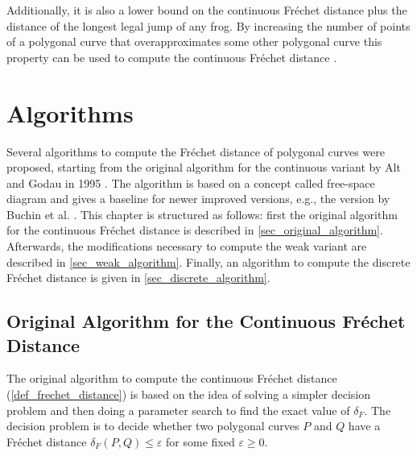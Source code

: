 \documentclass[
oneside,
fontsize=11pt
]{scrartcl}
\begin{document}
Additionally, it is also a lower bound on the continuous Fréchet distance 
plus the distance of the longest legal jump of any frog. 
By increasing the number of points of a polygonal curve that 
overapproximates some other polygonal curve
this property can be used to compute the continuous Fréchet distance \cite{eiter_computing_1994}.






\section{Algorithms}
\label{sec_algorithms}
Several algorithms to compute the Fréchet distance of polygonal curves were proposed, 
starting from the original algorithm for the continuous variant by Alt and Godau in 1995 \cite{alt_computing_1995}.
The algorithm is based on a concept called free-space diagram and gives a baseline for newer improved versions, 
e.g., the version by Buchin et al. \cite{buchin_four_2017}. 
This chapter is structured as follows: 
first the original algorithm for the continuous Fréchet distance is described in \autoref{sec_original_algorithm}.
Afterwards, the modifications necessary to compute the weak variant are described in \autoref{sec_weak_algorithm}.
Finally, an algorithm to compute the discrete Fréchet distance is given in \autoref{sec_discrete_algorithm}.


\subsection{Original Algorithm for the Continuous Fréchet Distance}
\label{sec_original_algorithm}
The original algorithm to compute the continuous Fréchet distance (\autoref{def_frechet_distance})
is based on the idea of solving a simpler decision problem and then doing a parameter search to find the exact value of $\delta_{F}$.
The decision problem is to decide whether two polygonal curves $P$ and $Q$ have a 
Fréchet distance $\delta_{F}(P,Q) \leq \varepsilon$ for some fixed $\varepsilon \geq 0$.
\end{document}
